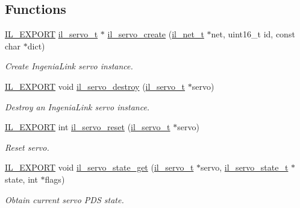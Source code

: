 \subsection*{Functions}
\begin{DoxyCompactItemize}
\item 
\hyperlink{common_8h_a6bb629d26c52bfe10519ba3176853f47}{I\+L\+\_\+\+E\+X\+P\+O\+RT} \hyperlink{group__IL__SERVO_ga3369ddfcc33492fe3a28f96cf455b13e}{il\+\_\+servo\+\_\+t} $\ast$ \hyperlink{group__IL__SERVO_gaa3728b10386d3b9f67258a95cb3c2913}{il\+\_\+servo\+\_\+create} (\hyperlink{group__IL__NET_ga0657204ab779a5b7a504aa0b895d1ae6}{il\+\_\+net\+\_\+t} $\ast$net, uint16\+\_\+t id, const char $\ast$dict)
\begin{DoxyCompactList}\small\item\em Create Ingenia\+Link servo instance. \end{DoxyCompactList}\item 
\hyperlink{common_8h_a6bb629d26c52bfe10519ba3176853f47}{I\+L\+\_\+\+E\+X\+P\+O\+RT} void \hyperlink{group__IL__SERVO_gade6d6e8ae2488af2a6ae6a6c484eaf32}{il\+\_\+servo\+\_\+destroy} (\hyperlink{group__IL__SERVO_ga3369ddfcc33492fe3a28f96cf455b13e}{il\+\_\+servo\+\_\+t} $\ast$servo)
\begin{DoxyCompactList}\small\item\em Destroy an Ingenia\+Link servo instance. \end{DoxyCompactList}\item 
\hyperlink{common_8h_a6bb629d26c52bfe10519ba3176853f47}{I\+L\+\_\+\+E\+X\+P\+O\+RT} int \hyperlink{group__IL__SERVO_ga1d0ef8479c2144e2abd9f18d7a875a34}{il\+\_\+servo\+\_\+reset} (\hyperlink{group__IL__SERVO_ga3369ddfcc33492fe3a28f96cf455b13e}{il\+\_\+servo\+\_\+t} $\ast$servo)
\begin{DoxyCompactList}\small\item\em Reset servo. \end{DoxyCompactList}\item 
\hyperlink{common_8h_a6bb629d26c52bfe10519ba3176853f47}{I\+L\+\_\+\+E\+X\+P\+O\+RT} void \hyperlink{group__IL__SERVO_ga52d4dfa8d34a7cce329d997c8ee8c38a}{il\+\_\+servo\+\_\+state\+\_\+get} (\hyperlink{group__IL__SERVO_ga3369ddfcc33492fe3a28f96cf455b13e}{il\+\_\+servo\+\_\+t} $\ast$servo, \hyperlink{group__IL__SERVO_ga34dfa4c089ba4ee833652ac6c40acd0d}{il\+\_\+servo\+\_\+state\+\_\+t} $\ast$state, int $\ast$flags)
\begin{DoxyCompactList}\small\item\em Obtain current servo P\+DS state. \end{DoxyCompactList}\item 

\end{DoxyCompactItemize}
